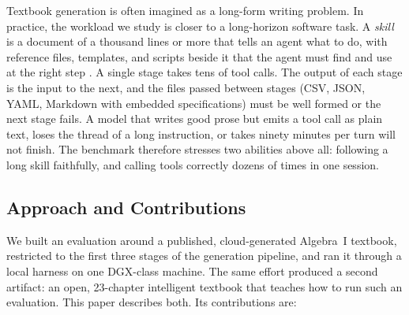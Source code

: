 Textbook generation is often imagined as a long-form writing problem. In practice, the workload we study is closer to a long-horizon software task. A \textit{skill} is a document of a thousand lines or more that tells an agent what to do, with reference files, templates, and scripts beside it that the agent must find and use at the right step \cite{anthropic2025skills}. A single stage takes tens of tool calls. The output of each stage is the input to the next, and the files passed between stages (CSV, JSON, YAML, Markdown with embedded specifications) must be well formed or the next stage fails. A model that writes good prose but emits a tool call as plain text, loses the thread of a long instruction, or takes ninety minutes per turn will not finish. The benchmark therefore stresses two abilities above all: following a long skill faithfully, and calling tools correctly dozens of times in one session.

\subsection{Approach and Contributions}

We built an evaluation around a published, cloud-generated Algebra~I textbook, restricted to the first three stages of the generation pipeline, and ran it through a local harness on one DGX-class machine. The same effort produced a second artifact: an open, 23-chapter intelligent textbook that teaches how to run such an evaluation. This paper describes both. Its contributions are:

